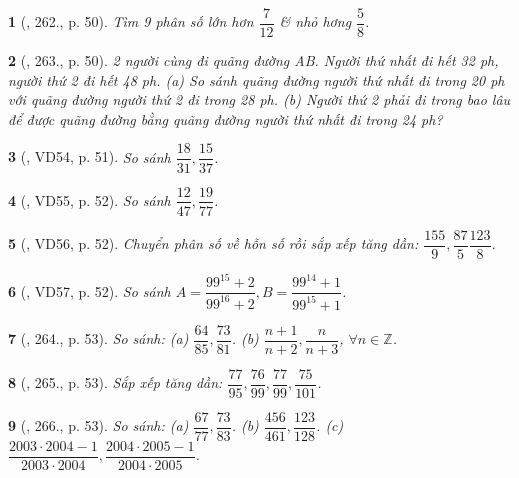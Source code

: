 \documentclass{article}
\newtheorem{baitoan}{}
\begin{document}
\begin{baitoan}[\cite{Tuyen_Toan_6}, 262., p. 50]
	Tìm 9 phân số lớn hơn $\dfrac{7}{12}$ \& nhỏ hơng $\dfrac{5}{8}$.
\end{baitoan}

\begin{baitoan}[\cite{Tuyen_Toan_6}, 263., p. 50]
	2 người cùng đi quãng đường AB. Người thứ nhất đi hết {\rm32 ph}, người thứ 2 đi hết {\rm48 ph}. (a) So sánh quãng đường người thứ nhất đi trong {\rm20 ph} với quãng đường người thứ 2 đi trong {\rm28 ph}. (b) Người thứ 2 phải đi trong bao lâu để được quãng đường bằng quãng đường người thứ nhất đi trong {\rm24 ph}?
\end{baitoan}

\begin{baitoan}[\cite{Tuyen_Toan_6}, VD54, p. 51]
	So sánh $\dfrac{18}{31},\dfrac{15}{37}$.
\end{baitoan}

\begin{baitoan}[\cite{Tuyen_Toan_6}, VD55, p. 52]
	So sánh $\dfrac{12}{47},\dfrac{19}{77}$.
\end{baitoan}

\begin{baitoan}[\cite{Tuyen_Toan_6}, VD56, p. 52]
	Chuyển phân số về hỗn số rồi sắp xếp tăng dần: $\dfrac{155}{9},\dfrac{87}{5}\dfrac{123}{8}$.
\end{baitoan}

\begin{baitoan}[\cite{Tuyen_Toan_6}, VD57, p. 52]
	So sánh $A = \dfrac{99^{15} + 2}{99^{16} + 2},B = \dfrac{99^{14} + 1}{99^{15} + 1}$.
\end{baitoan}

\begin{baitoan}[\cite{Tuyen_Toan_6}, 264., p. 53]
	So sánh: (a) $\dfrac{64}{85},\dfrac{73}{81}$. (b) $\dfrac{n + 1}{n + 2},\dfrac{n}{n + 3}$, $\forall n\in\mathbb{Z}$.
\end{baitoan}

\begin{baitoan}[\cite{Tuyen_Toan_6}, 265., p. 53]
	Sắp xếp tăng dần: $\dfrac{77}{95},\dfrac{76}{99},\dfrac{77}{99},\dfrac{75}{101}$.
\end{baitoan}

\begin{baitoan}[\cite{Tuyen_Toan_6}, 266., p. 53]
	So sánh: (a) $\dfrac{67}{77},\dfrac{73}{83}$. (b) $\dfrac{456}{461},\dfrac{123}{128}$. (c) $\dfrac{2003\cdot2004 - 1}{2003\cdot2004},\dfrac{2004\cdot2005 - 1}{2004\cdot2005}$.
\end{baitoan}
\end{document}
